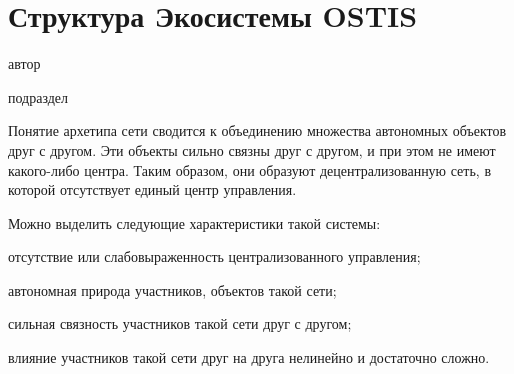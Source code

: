 \chapter{Структура Экосистемы OSTIS}
{\label{chapter_ecosystem}}

\vspace{-7\baselineskip}

\begin{SCn}
\begin{scnrelfromlist}{автор}
\end{scnrelfromlist}

\bigskip


\bigskip

\begin{scnrelfromlist}{подраздел}
\end{scnrelfromlist}

\end{SCn}

Понятие архетипа сети сводится к объединению множества автономных объектов друг с другом. Эти объекты сильно связны друг с другом, и при этом не имеют какого-либо центра. Таким образом, они образуют децентрализованную сеть, в которой отсутствует единый центр управления.

Можно выделить следующие характеристики такой системы:
\begin{textitemize}
    \item отсутствие или слабовыраженность централизованного управления;
    \item автономная природа участников, объектов такой сети;
    \item сильная связность участников такой сети друг с другом;
    \item влияние участников такой сети друг на друга нелинейно и достаточно сложно.
\end{textitemize}

